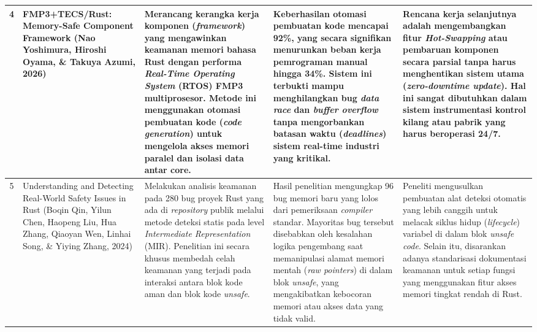 \documentclass[12pt,a4paper]{article}
\begin{document}
\begin{small}
\begin{longtable}{|c|>{\raggedright\arraybackslash}p{3cm}|>{\raggedright\arraybackslash}p{4cm}|>{\raggedright\arraybackslash}p{4cm}|>{\raggedright\arraybackslash}p{4cm}|}
4 & FMP3+TECS/Rust: Memory-Safe Component Framework (Nao Yoshimura, Hiroshi Oyama, \& Takuya Azumi, 2026) & Merancang kerangka kerja komponen (\textit{framework}) yang mengawinkan keamanan memori bahasa Rust dengan performa \textit{Real-Time Operating System} (RTOS) FMP3 multiprosesor. Metode ini menggunakan otomasi pembuatan kode (\textit{code generation}) untuk mengelola akses memori paralel dan isolasi data antar core. & Keberhasilan otomasi pembuatan kode mencapai 92\%, yang secara signifikan menurunkan beban kerja pemrograman manual hingga 34\%. Sistem ini terbukti mampu menghilangkan bug \textit{data race} dan \textit{buffer overflow} tanpa mengorbankan batasan waktu (\textit{deadlines}) sistem real-time industri yang kritikal. & Rencana kerja selanjutnya adalah mengembangkan fitur \textit{Hot-Swapping} atau pembaruan komponen secara parsial tanpa harus menghentikan sistem utama (\textit{zero-downtime update}). Hal ini sangat dibutuhkan dalam sistem instrumentasi kontrol kilang atau pabrik yang harus beroperasi 24/7. \\ \hline

5 & Understanding and Detecting Real-World Safety Issues in Rust (Boqin Qin, Yilun Chen, Haopeng Liu, Hua Zhang, Qiaoyan Wen, Linhai Song, \& Yiying Zhang, 2024) & Melakukan analisis keamanan pada 280 bug proyek Rust yang ada di \textit{repository} publik melalui metode deteksi statis pada level \textit{Intermediate Representation} (MIR). Penelitian ini secara khusus membedah celah keamanan yang terjadi pada interaksi antara blok kode aman dan blok kode \textit{unsafe}. & Hasil penelitian mengungkap 96 bug memori baru yang lolos dari pemeriksaan \textit{compiler} standar. Mayoritas bug tersebut disebabkan oleh kesalahan logika pengembang saat memanipulasi alamat memori mentah (\textit{raw pointers}) di dalam blok \textit{unsafe}, yang mengakibatkan kebocoran memori atau akses data yang tidak valid. & Peneliti mengusulkan pembuatan alat deteksi otomatis yang lebih canggih untuk melacak siklus hidup (\textit{lifecycle}) variabel di dalam blok \textit{unsafe code}. Selain itu, disarankan adanya standarisasi dokumentasi keamanan untuk setiap fungsi yang menggunakan fitur akses memori tingkat rendah di Rust. \\ \hline


\end{longtable}
\end{small}
\end{document}
